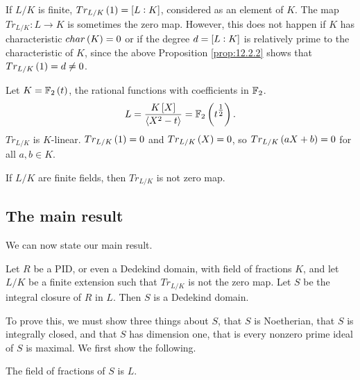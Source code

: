 \pagebreak

\begin{remark}
If $ L / K $ is finite, $ Tr_{L / K}\br{1} = \sbr{L : K} $, considered as an element of $ K $. The map $ Tr_{L / K} : L \to K $ is sometimes the zero map. However, this does not happen if $ K $ has characteristic $ char\br{K} = 0 $ or if the degree $ d = \sbr{L : K} $ is relatively prime to the characteristic of $ K $, since the above Proposition \ref{prop:12.2.2} shows that $ Tr_{L / K}\br{1} = d \ne 0 $.
\end{remark}

\begin{example*}
Let $ K = \F_2\br{t} $, the rational functions with coefficients in $ \mathbb{F}_2 $.
$$ L = \dfrac{K\sbr{X}}{\abr{X^2 - t}} = \F_2\br{t^{\tfrac{1}{2}}}. $$
$ Tr_{L / K} $ is $ K $-linear. $ Tr_{L / K}\br{1} = 0 $ and $ Tr_{L / K}\br{X} = 0 $, so $ Tr_{L / K}\br{aX + b} = 0 $ for all $ a, b \in K $.
\end{example*}

\begin{proposition}
If $ L / K $ are finite fields, then $ Tr_{L / K} $ is not zero map.
\end{proposition}

\subsection{The main result}

We can now state our main result.

\begin{theorem}
Let $ R $ be a PID, or even a Dedekind domain, with field of fractions $ K $, and let $ L / K $ be a finite extension such that $ Tr_{L / K} $ is not the zero map. Let $ S $ be the integral closure of $ R $ in $ L $. Then $ S $ is a Dedekind domain.
\end{theorem}

To prove this, we must show three things about $ S $, that $ S $ is Noetherian, that $ S $ is integrally closed, and that $ S $ has dimension one, that is every nonzero prime ideal of $ S $ is maximal. We first show the following.

\begin{lemma}
The field of fractions of $ S $ is $ L $.
\end{lemma}

